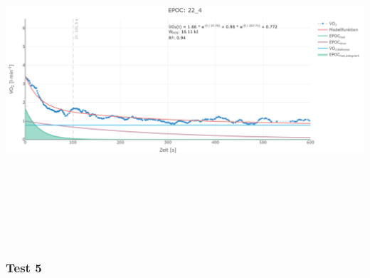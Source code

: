 \documentclass[
  letterpaper,
  DIV=11]{scrartcl}
\begin{document}
\includegraphics[width=11.45833in,height=4.6875in]{images/22_4.png}

\subsubsection{Test 5}
\end{document}
